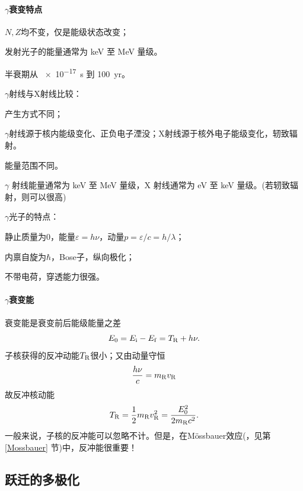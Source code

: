 \paragraph{$\gamma$衰变特点}
\begin{compactenum}
	\item $N,Z$均不变，仅是能级状态改变；
	\item 发射光子的能量通常为 \unit{keV} 至 \unit{MeV} 量级。
	\item 半衰期从 \qty{e-17}{s} 到 \qty{100}{yr}。
\end{compactenum}
$\gamma$射线与X射线比较：
\begin{compactenum}
	\item 产生方式不同；
	
	$\gamma$射线源于核内能级变化、正负电子湮没；X射线源于核外电子能级变化，轫致辐射。
	\item 能量范围不同。
	
	$\gamma$ 射线能量通常为 \unit{keV} 至 \unit{MeV} 量级，X 射线通常为 \unit{eV} 至 \unit{keV} 量级。(若轫致辐射，则可以很高)
\end{compactenum}
$\gamma$光子的特点：
\begin{compactenum}
	\item 静止质量为0，能量$\varepsilon = h\nu$，动量$p = \varepsilon/c = h/\lambda$；
	\item 内禀自旋为$\hbar$，Bose子，纵向极化；
	\item 不带电荷，穿透能力很强。
\end{compactenum}
\paragraph{$\gamma$衰变能}
衰变能是衰变前后能级能量之差
\begin{equation}\label{eq:nrd-gamma-decay-energy}
	E_0 = E_\mathrm i - E_\mathrm f = T_{\mathrm{R}} + h\nu.
\end{equation}
子核获得的反冲动能$T_{\mathrm{R}}$很小；又由动量守恒
\[
	\frac{h\nu}c = m_{\mathrm{R}}v_{\mathrm{R}}
\]
故反冲核动能
\begin{align}
	T_{\mathrm{R}} = \frac12m_{\mathrm{R}}v_{\mathrm{R}}^2 = \frac{E_0^2}{2m_{\mathrm{R}}c^2}.
\end{align}
一般来说，子核的反冲能可以忽略不计。但是，在Mössbauer效应(，见第 \ref{Mossbauer} 节)中，反冲能很重要！

\subsection{\gammaray 跃迁的多极化}

